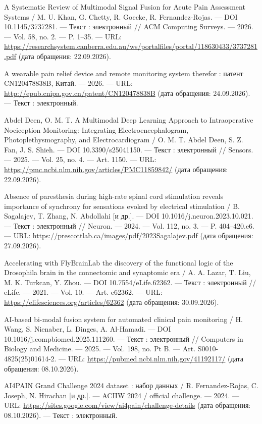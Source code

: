\begin{list}{}{\setlength{\leftmargin}{10mm}\setlength{\labelwidth}{8mm}\setlength{\labelsep}{2mm}\setlength{\itemsep}{0pt}\setlength{\parsep}{0pt}\setlength{\topsep}{0pt}}
\item[21.] A Systematic Review of Multimodal Signal Fusion for Acute Pain Assessment Systems / M. U. Khan, G. Chetty, R. Goecke, R. Fernandez-Rojas. — DOI 10.1145/3737281. — Текст : электронный // ACM Computing Surveys. — 2026. — Vol. 58, no. 2. — P. 1–35. — URL: \url{https://researchsystem.canberra.edu.au/ws/portalfiles/portal/118630433/3737281.pdf} (дата обращения: 22.09.2026).
\item[22.] A wearable pain relief device and remote monitoring system therefor : патент CN120478838B, Китай. — 2026. — URL: \url{http://epub.cnipa.gov.cn/patent/CN120478838B} (дата обращения: 24.09.2026). — Текст : электронный.
\item[23.] Abdel Deen, O. M. T. A Multimodal Deep Learning Approach to Intraoperative Nociception Monitoring: Integrating Electroencephalogram, Photoplethysmography, and Electrocardiogram / O. M. T. Abdel Deen, S. Z. Fan, J. S. Shieh. — DOI 10.3390/s25041150. — Текст : электронный // Sensors. — 2025. — Vol. 25, no. 4. — Art. 1150. — URL: \url{https://pmc.ncbi.nlm.nih.gov/articles/PMC11859842/} (дата обращения: 22.09.2026).
\item[24.] Absence of paresthesia during high-rate spinal cord stimulation reveals importance of synchrony for sensations evoked by electrical stimulation / B. Sagalajev, T. Zhang, N. Abdollahi [и др.]. — DOI 10.1016/j.neuron.2023.10.021. — Текст : электронный // Neuron. — 2024. — Vol. 112, no. 3. — P. 404–420.e6. — URL: \url{https://prescottlab.ca/images/pdf/2023Sagalajev.pdf} (дата обращения: 27.09.2026).
\item[25.] Accelerating with FlyBrainLab the discovery of the functional logic of the Drosophila brain in the connectomic and synaptomic era / A. A. Lazar, T. Liu, M. K. Turkcan, Y. Zhou. — DOI 10.7554/eLife.62362. — Текст : электронный // eLife. — 2021. — Vol. 10. — Art. e62362. — URL: \url{https://elifesciences.org/articles/62362} (дата обращения: 30.09.2026).
\item[26.] AI-based bi-modal fusion system for automated clinical pain monitoring / H. Wang, S. Nienaber, L. Dinges, A. Al-Hamadi. — DOI 10.1016/j.compbiomed.2025.111260. — Текст : электронный // Computers in Biology and Medicine. — 2025. — Vol. 198, no. Pt B. — Art. S0010-4825(25)01614-2. — URL: \url{https://pubmed.ncbi.nlm.nih.gov/41192117/} (дата обращения: 08.10.2026).
\item[27.] AI4PAIN Grand Challenge 2024 dataset : набор данных / R. Fernandez-Rojas, C. Joseph, N. Hirachan [и др.]. — ACIIW 2024 / official challenge. — 2024. — URL: \url{https://sites.google.com/view/ai4pain/challenge-details} (дата обращения: 08.10.2026). — Текст : электронный.

\end{list}
